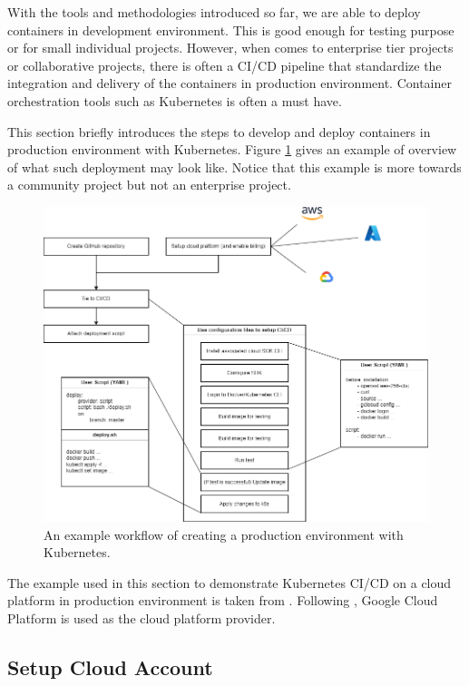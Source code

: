 With the tools and methodologies introduced so far, we are able to deploy containers in development environment. This is good enough for testing purpose or for small individual projects. However, when comes to enterprise tier projects or collaborative projects, there is often a CI/CD pipeline that standardize the integration and delivery of the containers in production environment. Container orchestration tools such as Kubernetes is often a must have.

This section briefly introduces the steps to develop and deploy containers in production environment with Kubernetes. Figure \ref{ch:vac:fig:prodenvworkflow} gives an example of overview of what such deployment may look like. Notice that this example is more towards a community project but not an enterprise project.

\begin{figure}[htbp]
	\centering
	\includegraphics[width=350pt]{chapters/part-3/figures/prodenvworkflow.png}
	\caption{An example workflow of creating a production environment with Kubernetes.} \label{ch:vac:fig:prodenvworkflow}
\end{figure}

The example used in this section to demonstrate Kubernetes CI/CD on a cloud platform in production environment is taken from \cite{stephen2023docker}. Following \cite{stephen2023docker}, Google Cloud Platform is used as the cloud platform provider.

\subsection{Setup Cloud Account}

